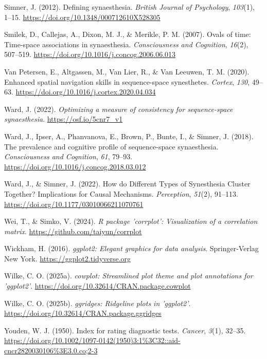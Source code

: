 \documentclass[
  man,
  longtable,
  a4paper,
  nolmodern,
  notxfonts,
  notimes,
  colorlinks=true,linkcolor=blue,citecolor=blue,urlcolor=blue]{apa7}
\newlength{\cslhangindent}
\newenvironment{CSLReferences}[2] %
 {\begin{list}{}{%
  \setlength{\itemindent}{0pt}
  \setlength{\leftmargin}{0pt}
  \setlength{\parsep}{0pt}
  \ifodd #1
   \setlength{\leftmargin}{\cslhangindent}
   \setlength{\itemindent}{-1\cslhangindent}
  \fi
  \setlength{\itemsep}{#2\baselineskip}}}
 {\end{list}}
\begin{document}
\begin{CSLReferences}{1}{0}
Simner, J. (2012). Defining synaesthesia. \emph{British Journal of
Psychology}, \emph{103}(1), 1--15.
\url{https://doi.org/10.1348/000712610X528305}

Smilek, D., Callejas, A., Dixon, M. J., \& Merikle, P. M. (2007). Ovals
of time: Time-space associations in synaesthesia. \emph{Consciousness
and Cognition}, \emph{16}(2), 507--519.
\url{https://doi.org/10.1016/j.concog.2006.06.013}

Van Petersen, E., Altgassen, M., Van Lier, R., \& Van Leeuwen, T. M.
(2020). Enhanced spatial navigation skills in sequence-space
synesthetes. \emph{Cortex}, \emph{130}, 49--63.
\url{https://doi.org/10.1016/j.cortex.2020.04.034}

Ward, J. (2022). \emph{Optimizing a measure of consistency for
sequence-space synaesthesia}. \url{https://osf.io/5cnr7_v1}

Ward, J., Ipser, A., Phanvanova, E., Brown, P., Bunte, I., \& Simner, J.
(2018). The prevalence and cognitive profile of sequence-space
synaesthesia. \emph{Consciousness and Cognition}, \emph{61}, 79--93.
\url{https://doi.org/10.1016/j.concog.2018.03.012}

Ward, J., \& Simner, J. (2022). How do Different Types of Synesthesia
Cluster Together? Implications for Causal Mechanisms. \emph{Perception},
\emph{51}(2), 91--113. \url{https://doi.org/10.1177/03010066211070761}

Wei, T., \& Simko, V. (2024). \emph{R package '{corrplot}':
Visualization of a correlation matrix}.
\url{https://github.com/taiyun/corrplot}

Wickham, H. (2016). \emph{{ggplot2}: Elegant graphics for data
analysis}. Springer-Verlag New York. \url{https://ggplot2.tidyverse.org}

Wilke, C. O. (2025a). \emph{{cowplot}: Streamlined plot theme and plot
annotations for 'ggplot2'}.
\url{https://doi.org/10.32614/CRAN.package.cowplot}

Wilke, C. O. (2025b). \emph{{ggridges}: Ridgeline plots in 'ggplot2'}.
\url{https://doi.org/10.32614/CRAN.package.ggridges}

Youden, W. J. (1950). Index for rating diagnostic tests. \emph{Cancer},
\emph{3}(1), 32--35.
\url{https://doi.org/10.1002/1097-0142(1950)3:1\%3C32::aid-cncr2820030106\%3E3.0.co;2-3}

\end{CSLReferences}
\end{document}
